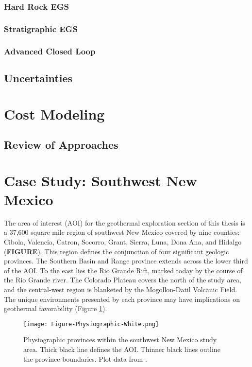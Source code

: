\subsubsection{Hard Rock EGS}

\subsubsection{Stratigraphic EGS}

\subsubsection{Advanced Closed Loop}

\subsection{Uncertainties}

\section{Cost Modeling}\label{ch2:costmod}

\subsection{Review of Approaches}

\section{Case Study: Southwest New Mexico}\label{ch2:case}

The area of interest (AOI) for the geothermal exploration section of this thesis is a 37,600 square mile region of southwest New Mexico covered by nine counties: Cibola, Valencia, Catron, Socorro, Grant, Sierra, Luna, Dona Ana, and Hidalgo (\textbf{FIGURE}). This region defines the conjunction of four significant geologic provinces. The Southern Basin and Range province extends across the lower third of the AOI. To the east lies the Rio Grande Rift, marked today by the course of the Rio Grande river. The Colorado Plateau covers the north of the study area, and the central-west region is blanketed by the Mogollon-Datil Volcanic Field. The unique environments presented by each province may have implications on geothermal favorability \citep{pepin_new_2018} (Figure \ref{fig:phys-provinces}).

\begin{figure}[h!]
\centering
\texttt{[image: Figure-Physiographic-White.png]}
\caption[Physiographic provinces of southwest New Mexico]{Physiographic provinces within the southwest New Mexico study area. Thick black line defines the AOI. Thinner black lines outline the province boundaries. Plot data from \protect\citep[~Figure 2-2]{bielicki_hydrogeolgic_2015}.}
\label{fig:phys-provinces}
\end{figure}

